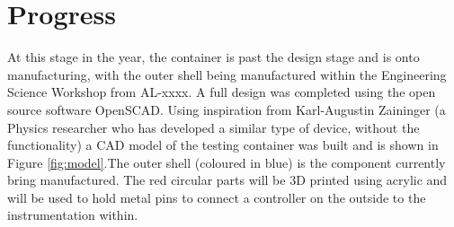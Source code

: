 \documentclass[a4paper,11pt]{article}
\begin{document}
\section{Progress}
At this stage in the year, the container is past the design stage and is onto manufacturing, with the outer shell being manufactured within the Engineering Science Workshop from AL-xxxx. A full design was completed using the open source software OpenSCAD. Using inspiration from Karl-Augustin Zaininger (a Physics researcher who has developed a similar type of device, without the functionality) a CAD model of the testing container was built and is shown in Figure \ref{fig:model}.The outer shell (coloured in blue) is the component currently bring manufactured. The red circular parts will be 3D printed using acrylic and will be used to hold metal pins to connect a controller on the outside to the instrumentation within.  \\ 
\end{document}
